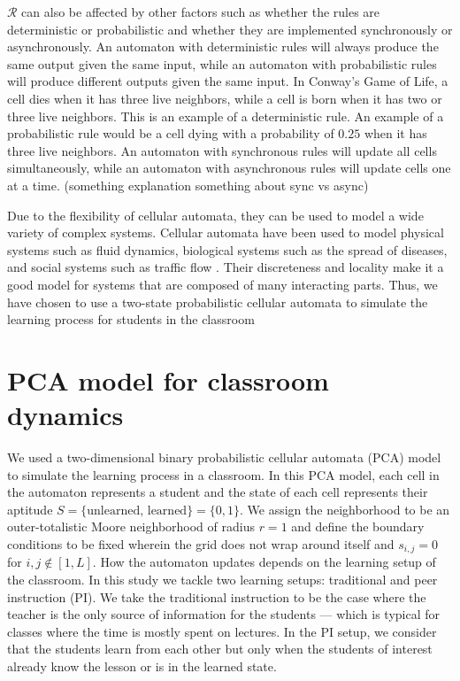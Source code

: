 $\mathcal{R}$ can also be affected by other factors such as whether the rules are deterministic or probabilistic and whether they are implemented synchronously or asynchronously. 
An automaton with deterministic rules will always produce the same output given the same input, while an automaton with probabilistic rules will produce different outputs given the same input. 
In Conway's Game of Life, a cell dies when it has three live neighbors, while a cell is born when it has two or three live neighbors. 
This is an example of a deterministic rule. An example of a probabilistic rule would be a cell dying with a probability of $0.25$ when it has three live neighbors. 
An automaton with synchronous rules will update all cells simultaneously, while an automaton with asynchronous rules will update cells one at a time. 
(something explanation something about sync vs async)


Due to the flexibility of cellular automata, they can be used to model a wide variety of complex systems.
Cellular automata have been used to model physical systems such as fluid dynamics, biological systems such as the spread of diseases, and social systems such as traffic flow \cite{louis2018probabilistic}.
Their discreteness and locality make it a good model for systems that are composed of many interacting parts.
Thus, we have chosen to use a two-state probabilistic cellular automata to simulate the learning process for students in the classroom


\section{PCA model for classroom dynamics}
We used a two-dimensional binary probabilistic cellular automata (PCA) model to simulate the learning process in a classroom. 
In this PCA model, each cell in the automaton represents a student and the state of each cell represents their aptitude $S=\lbrace\text{unlearned, learned}\rbrace=\lbrace 0,1 \rbrace$. 
We assign the neighborhood to be an outer-totalistic Moore neighborhood of radius $r=1$ and define the boundary conditions to be fixed wherein the grid does not wrap around itself and $s_{i,j} = 0$ for ${i,j \notin [1,L]}$. 
How the automaton updates depends on the learning setup of the classroom. In this study we tackle two learning setups: traditional and peer instruction (PI). 
We take the traditional instruction to be the case where the teacher is the only source of information for the students --- which is typical for classes where the time is mostly spent on lectures. 
In the PI setup, we consider that the students learn from each other but only when the students of interest already know the lesson or is in the learned state.


